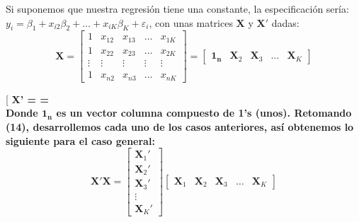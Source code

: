 \documentclass[
  a4paper,
]{article}
\begin{document}
Si suponemos que nuestra regresión tiene una constante, la especificación sería: $y_i = \beta_1 + x_{i2}\beta_2 + \ldots + x_{iK}\beta_K + \varepsilon_i$, con unas matrices $\mathbf X$ y $\mathbf X'$ dadas:
\[
\mathbf{X} = 
\left[ \begin{array}{ccccc}
1 & x_{12} & x_{13} & \ldots & x_{1K} \\
1 & x_{22} & x_{23} & \ldots & x_{2K} \\
\vdots & \vdots & \vdots & \vdots & \vdots \\
1 & x_{n2} & x_{n3} & \ldots & x_{nK}
\end{array} \right] =
\left[ \begin{array}{ccccc}
\mathbf{1_n} & \mathbf{X}_2& \mathbf{X}_3 & \ldots & \mathbf{X}_K
\end{array} \right]
\]

{[} \bf{X'} = 
 =
\]\\

Donde $\mathbf{1_n}$ es un vector columna compuesto de 1's (unos). Retomando (14), desarrollemos cada uno de los casos anteriores, así obtenemos lo siguiente para el caso general:
\[
\mathbf{X'X} = 
\left[ \begin{array}{c}
\mathbf{X}_1' \\
\mathbf{X}_2' \\
\mathbf{X}_3'\\
\vdots \\
\mathbf{X}_K'
\end{array} \right]
\left[ \begin{array}{ccccc}
\mathbf{X}_1 & \mathbf{X}_2 & \mathbf{X}_3 & \ldots & \mathbf{X}_K
\end{array} \right]
\]
\end{document}
